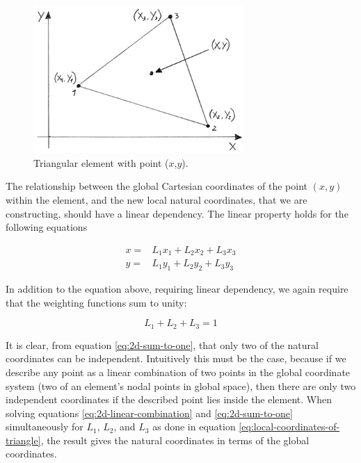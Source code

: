 \begin{figure}
  \centering
  \includegraphics[width=8cm]{./images/finite_element_method_point_in_triangle.png}
\caption{Triangular element with point ($x$,$y$).}
\label{fig:point-in-triangle}
\end{figure}

The relationship between the global Cartesian coordinates of the point
$(x,y)$ within the element, and the new local natural coordinates, that we
are constructing, should have a linear dependency. The linear property
holds for the following equations

\begin{equation}
\begin{aligned}
\label{eq:2d-linear-combination}
x =& L_1 x_1 + L_2 x_2 + L_3 x_3 \\
y =& L_1 y_1 + L_2 y_2 + L_3 y_3
\end{aligned}
\end{equation}

In addition to the equation above, requiring linear dependency, we
again require that the weighting functions sum to unity:

\begin{equation}
\label{eq:2d-sum-to-one}
L_1 + L_2 + L_3 = 1
\end{equation}

It is clear, from equation \eqref{eq:2d-sum-to-one}, that only two of
the natural coordinates can be independent. Intuitively this must be
the case, because if we describe any point as a linear combination of
two points in the global coordinate system (two of an element's nodal
points in global space), then there are only two independent
coordinates if the described point lies inside the element.
When solving  equations \eqref{eq:2d-linear-combination} and
\eqref{eq:2d-sum-to-one} simultaneously for $L_1$, $L_2$, and $L_3$ as
done in equation \eqref{eq:local-coordinates-of-triangle}, the result
gives the natural coordinates in terms of the global coordinates.

